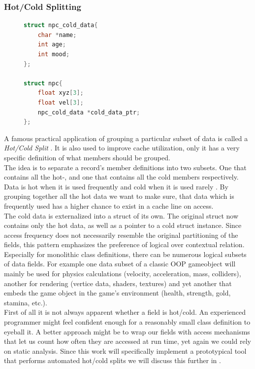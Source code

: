 \subsubsection{Hot/Cold Splitting}\label{hot_cold_splitting}
\begin{figure}
\begin{lstlisting}[language=C++,numbers=none,name={The NPC class splitted into hot/cold data},label={hcsplit_npc}]
struct npc_cold_data{
	char *name;
	int age;
	int mood;
};

struct npc{
	float xyz[3];
	float vel[3];
	npc_cold_data *cold_data_ptr;
};
\end{lstlisting}
\end{figure}
A famous practical application of grouping a particular subset of data is called a \textit{Hot/Cold Split} . It is also used to improve cache utilization, only it has a very specific definition of what members should be grouped.\\
The idea is to separate a record's member definitions into two subsets. One that contains all the hot-, and one that contains all the cold members respectively. Data is hot when it is used frequently and cold when it is used rarely . By grouping together all the hot data we want to make sure, that data which is frequently used has a higher chance to exist in a cache line on access.\\
The cold data is externalized into a struct of its own. The original struct now contains only the hot data, as well as a pointer to a cold struct instance. Since access frequency does not necessarily resemble the original partitioning of the fields, this pattern emphasizes the preference of logical over contextual relation.\\
Especially for monolithic class definitions, there can be numerous logical subsets of data fields. For example one data subset of a classic OOP gameobject will mainly be used for physics calculations (velocity, acceleration, mass, colliders), another for rendering (vertice data, shaders, textures) and yet another that embeds the game object in the game's environment (health, strength, gold, stamina, etc.).\\
First of all it is not always apparent whether a field is hot/cold. An experienced programmer might feel confident enough for a reasonably small class definition to eyeball it. A better approach might be to wrap our fields with access mechanisms that let us count how often they are accessed at run time, yet again we could rely on static analysis. Since this work will specifically implement a prototypical tool that performs automated hot/cold splits we will discuss this further in .\\
